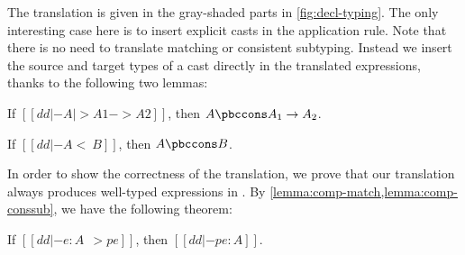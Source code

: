 The translation is given in the gray-shaded parts in \cref{fig:decl-typing}. The
only interesting case here is to insert explicit casts in the application rule.
Note that there is no need to translate matching or consistent subtyping.
Instead we insert the source and target types of a cast directly in the
translated expressions, thanks to the following two lemmas:

\begin{clemma}%
  \label{lemma:comp-match}
  If $[[ dd |- A |> A1 -> A2  ]]$, then $A \pbccons A_1 \to A_2$.
\end{clemma}

\begin{clemma}%
  \label{lemma:comp-conssub}
  If $[[  dd |- A <~ B ]]$, then $A \pbccons B$.
\end{clemma}

In order to show the correctness of the translation, we prove that our
translation always produces well-typed expressions in \pbc. By
\cref{lemma:comp-match,lemma:comp-conssub}, we have the following theorem:

\renewcommand{\otthl}[1]{#1}

\begin{ctheorem}
  \label{lemma:type-safety}
  If $[[ dd |- e : A ~~> pe   ]]$, then $[[ dd |- pe : A ]]$.
\end{ctheorem}

